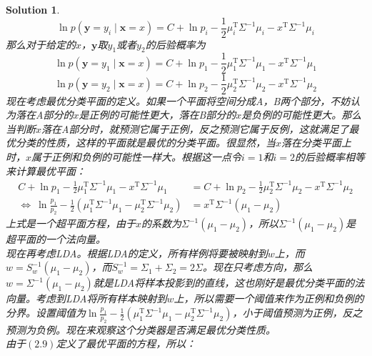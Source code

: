 \documentclass[a4paper,UTF8]{article}
\numberwithin{equation}{section}
\newtheorem*{solution}{Solution}
\begin{document}
\begin{solution}
\begin{equation}
\ln p(\mathbf{y} = y_i \mid  \mathbf{x} = x) = C + \ln p_i - \frac{1}{2} \mu_i^\mathrm{T}\Sigma^{-1}\mu_i - x^{\mathrm{T}}\Sigma^{-1}\mu_i 
\end{equation}
那么对于给定的$x$，$\mathbf{y}$取$y_1$或者$y_2$的后验概率为
\begin{equation}
\ln p(\mathbf{y} = y_1 \mid  \mathbf{x} = x) = C + \ln p_1 - \frac{1}{2} \mu_1^\mathrm{T}\Sigma^{-1}\mu_1 - x^{\mathrm{T}}\Sigma^{-1}\mu_1 
\end{equation}
\begin{equation}
\ln p(\mathbf{y} = y_2 \mid  \mathbf{x} = x) = C + \ln p_2 - \frac{1}{2} \mu_2^\mathrm{T}\Sigma^{-1}\mu_2 - x^{\mathrm{T}}\Sigma^{-1}\mu_2 
\end{equation}
现在考虑最优分类平面的定义。如果一个平面将空间分成A，B两个部分，不妨认为落在A部分的$x$是正例的可能性更大，落在B部分的$x$是负例的可能性更大。那么当判断$x$落在A部分时，就预测它属于正例，反之预测它属于反例，这就满足了最优分类的性质，这样的平面就是最优的分类平面。很显然，当$x$落在分类平面上时，$x$属于正例和负例的可能性一样大。根据这一点令$i=1$和$i=2$的后验概率相等来计算最优平面：
\begin{equation}
\begin{aligned}
C + \ln p_1 - \frac{1}{2} \mu_1^\mathrm{T}\Sigma^{-1}\mu_1 - x^{\mathrm{T}}\Sigma^{-1}\mu_1 &= C + \ln p_2 - \frac{1}{2} \mu_2^\mathrm{T}\Sigma^{-1}\mu_2 - x^{\mathrm{T}}\Sigma^{-1}\mu_2 \\
\Leftrightarrow\ \ln\frac{p_1}{p_2} - \frac{1}{2}(\mu_1^\mathrm{T}\Sigma^{-1}\mu_1 - \mu_2^\mathrm{T}\Sigma^{-1}\mu_2) &= x^{\mathrm{T}}\Sigma^{-1}(\mu_1 - \mu_2)
\end{aligned}
\end{equation}
上式是一个超平面方程，由于$x$的系数为$\Sigma^{-1}(\mu_1 - \mu_2)$，所以$\Sigma^{-1}(\mu_1 - \mu_2)$是超平面的一个法向量。\\
现在再考虑LDA。根据LDA的定义，所有样例将要被映射到$w$上，而$w = S^{-1}_w(\mu_1 - \mu_2)$，而$S^{-1}_w = \Sigma_1 + \Sigma_2 = 2\Sigma$。现在只考虑方向，那么$w = \Sigma^{-1}(\mu_1 - \mu_2)$就是LDA将样本投影到的直线，这也刚好是最优分类平面的法向量。考虑到LDA将所有样本映射到$w$上，所以需要一个阈值来作为正例和负例的分界。设置阈值为$\ln\frac{p_1}{p_2} - \frac{1}{2}(\mu_1^\mathrm{T}\Sigma^{-1}\mu_1 - \mu_2^\mathrm{T}\Sigma^{-1}\mu_2)$，小于阈值预测为正例，反之预测为负例。现在来观察这个分类器是否满足最优分类性质。\\
由于$(2.9)$定义了最优平面的方程，所以：\\

\end{solution}
\end{document}
